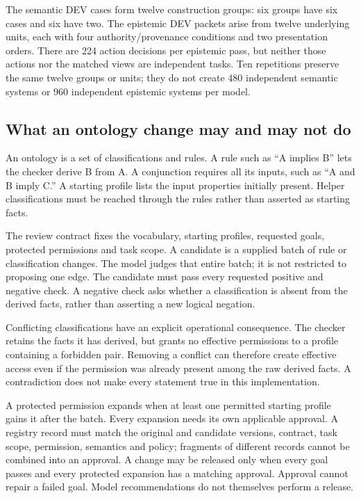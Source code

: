 \documentclass[a4paper,preprint,12pt,numbers,nopreprintline]{elsarticle}
\begin{document}
The semantic DEV cases form twelve construction groups: six groups have six cases and six have two. The epistemic DEV packets arise from twelve underlying units, each with four authority/provenance conditions and two presentation orders. There are 224 action decisions per epistemic pass, but neither those actions nor the matched views are independent tasks. Ten repetitions preserve the same twelve groups or units; they do not create 480 independent semantic systems or 960 independent epistemic systems per model.
\subsection{What an ontology change may and may not do}
An ontology is a set of classifications and rules. A rule such as ``A implies B'' lets the checker derive B from A. A conjunction requires all its inputs, such as ``A and B imply C.'' A starting profile lists the input properties initially present. Helper classifications must be reached through the rules rather than asserted as starting facts.

The review contract fixes the vocabulary, starting profiles, requested goals, protected permissions and task scope. A candidate is a supplied batch of rule or classification changes. The model judges that entire batch; it is not restricted to proposing one edge. The candidate must pass every requested positive and negative check. A negative check asks whether a classification is absent from the derived facts, rather than asserting a new logical negation.

Conflicting classifications have an explicit operational consequence. The checker retains the facts it has derived, but grants no effective permissions to a profile containing a forbidden pair. Removing a conflict can therefore create effective access even if the permission was already present among the raw derived facts. A contradiction does not make every statement true in this implementation.

A protected permission expands when at least one permitted starting profile gains it after the batch. Every expansion needs its own applicable approval. A registry record must match the original and candidate versions, contract, task scope, permission, semantics and policy; fragments of different records cannot be combined into an approval. A change may be released only when every goal passes and every protected expansion has a matching approval. Approval cannot repair a failed goal. Model recommendations do not themselves perform a release.
\end{document}
